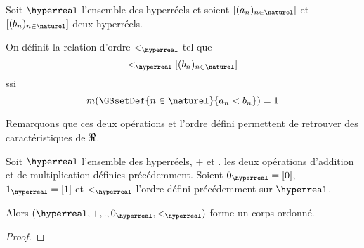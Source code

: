 \begin{definition}
	Soit $\hyperreal$ l'ensemble des hyperréels et soient $[(a_{n})_{n \in
	\naturel}]$ et $[(b_{n})_{n \in \naturel}]$ deux hyperréels.

	On définit la relation d'ordre $<_{\hyperreal}$ tel que
	\begin{equation}
		[(a_{n})_{n \in \naturel}] <_{\hyperreal} [(b_{n})_{n \in \naturel}]
	\end{equation}
	ssi
	\begin{equation}
		m(\GSsetDef{n \in \naturel}{a_{n} < b_{n}}) = 1
	\end{equation}
\end{definition}

Remarquons que ces deux opérations et l'ordre défini permettent de retrouver des
caractéristiques de $\real$.

\begin{proposition}
	Soit $\hyperreal$ l'ensemble des hyperréels, $+$ et $.$ les deux opérations
	d'addition et de multiplication définies précédemment.
	Soient $0_{\hyperreal} = [0]$, $1_{\hyperreal} = [1]$ et $<_{\hyperreal}$
	l'ordre défini précédemment sur $\hyperreal$.

	Alors $(\hyperreal, +, ., 0_{\hyperreal}, <_{\hyperreal})$ forme un corps
	ordonné.
\end{proposition}

\ifdefined\outputproof
\begin{proof}

\end{proof}
\fi
